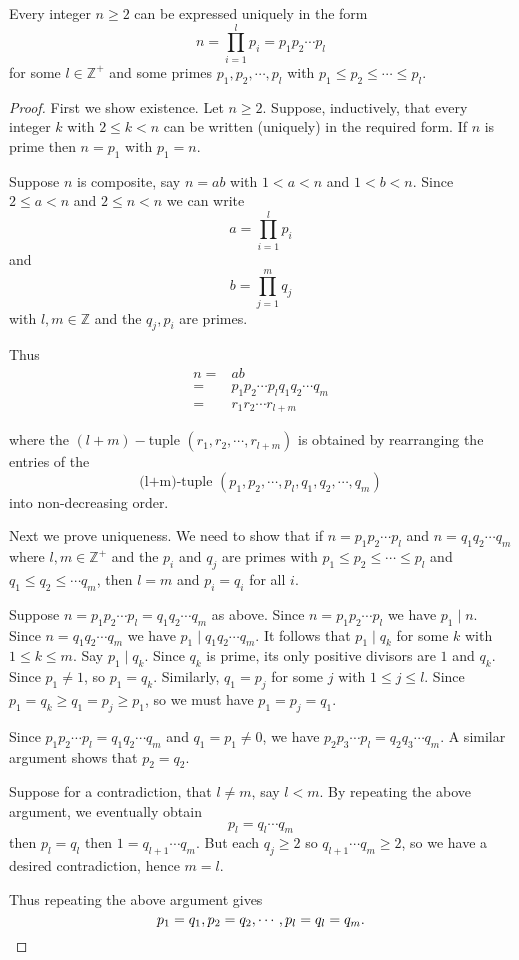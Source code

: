 
\begin{thm}
    Every integer $n\geq 2$ can be expressed uniquely in the form \[n=\prod_{i=1}^l p_i = p_1p_2\cdots p_l\] for some $l\in\mathbb{Z}^+$ and some primes $p_1,p_2,\cdots,p_l$ with $p_1\leq p_2\leq \cdots \leq p_l$.
\end{thm}

\begin{proof}
    First we show existence. Let $n\geq 2$. Suppose, inductively, that every integer $k$ with $2\leq k < n$ can be written (uniquely) in the required form. If $n$ is prime then $n = p_1$ with $p_1 = n$.
    
    Suppose $n$ is composite, say $n=ab$ with $1<a<n$ and $1<b<n$. Since $2\leq a < n$ and $2\leq n < n$ we can write \[a = \prod_{i=1}^l p_i\] and \[b = \prod_{j=1}^m q_j\] with $l,m\in\mathbb{Z}$ and the $q_j,p_i$ are primes.
    
    Thus \begin{align*}
        n = & ab \\
        = & p_1p_2\cdots p_lq_1q_2\cdots q_m\\
        = & r_1r_2\cdots r_{l+m}
    \end{align*}
    
    where the $(l+m)-$tuple $(r_1,r_2,\cdots ,r_{l+m})$ is obtained by rearranging the entries of the \[\text{(l+m)-tuple } (p_1,p_2,\cdots ,p_{l},q_1,q_2,\cdots ,q_{m})\] into non-decreasing order.
    
    Next we prove uniqueness. We need to show that if $n=p_1p_2\cdots p_l$ and $n=q_1q_2\cdots q_m$ where $l,m\in\mathbb{Z}^+$ and the $p_i$ and $q_j$ are primes with $p_1\leq p_2 \leq \cdots \leq p_l$ and $q_1\leq q_2\leq \cdots q_m$, then $l=m$ and $p_i=q_i$ for all $i$.
    
    Suppose $n=p_1p_2\cdots p_l=q_1q_2\cdots q_m$ as above. Since $n=p_1p_2\cdots p_l$ we have $p_1\mid n$. Since $n=q_1q_2\cdots q_m$ we have $p_1\mid q_1q_2\cdots q_m$. It follows that $p_1\mid q_k$ for some $k$ with $1\leq k\leq m$. Say $p_1\mid q_k$. Since $q_k$ is prime, its only positive divisors are $1$ and $q_k$. Since $p_1\neq 1$, so $p_1 = q_k$. Similarly, $q_1 = p_j$ for some $j$ with $1\leq j\leq l$. Since $p_1 = q_k \geq q_1 = p_j \geq p_1$, so we must have $p_1=p_j=q_1$.
    
    Since $p_1p_2\cdots p_l = q_1q_2\cdots q_m$ and $q_1 = p_1 \neq 0$, we have $p_2p_3\cdots p_l = q_2q_3\cdots q_m$. A similar argument shows that $p_2 = q_2$. 
    
    Suppose for a contradiction, that $l\neq m$, say $l<m$. By repeating the above argument, we eventually obtain \[p_l = q_l \cdots q_m\] then $p_l = q_l$ then $1 = q_{l+1} \cdots q_m$. But each $q_j \geq 2$ so $q_{l+1} \cdots q_m \geq 2$, so we have a desired contradiction, hence $m=l$.
    
    Thus repeating the above argument gives \[p_1=q_1, p_2=q_2, \cdots ,p_l = q_l = q_m. \qedhere\] 
\end{proof}



